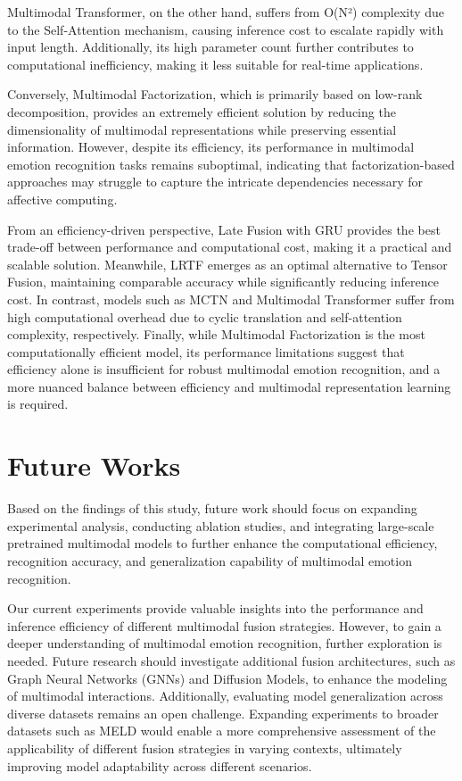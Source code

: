 \documentclass{article}
\begin{document}
Multimodal Transformer, on the other hand, suffers from O(N²) complexity due to the Self-Attention mechanism, causing inference cost to escalate rapidly with input length. Additionally, its high parameter count further contributes to computational inefficiency, making it less suitable for real-time applications.

Conversely, Multimodal Factorization, which is primarily based on low-rank decomposition, provides an extremely efficient solution by reducing the dimensionality of multimodal representations while preserving essential information. However, despite its efficiency, its performance in multimodal emotion recognition tasks remains suboptimal, indicating that factorization-based approaches may struggle to capture the intricate dependencies necessary for affective computing.

From an efficiency-driven perspective, Late Fusion with GRU provides the best trade-off between performance and computational cost, making it a practical and scalable solution. Meanwhile, LRTF emerges as an optimal alternative to Tensor Fusion, maintaining comparable accuracy while significantly reducing inference cost. In contrast, models such as MCTN and Multimodal Transformer suffer from high computational overhead due to cyclic translation and self-attention complexity, respectively. Finally, while Multimodal Factorization is the most computationally efficient model, its performance limitations suggest that efficiency alone is insufficient for robust multimodal emotion recognition, and a more nuanced balance between efficiency and multimodal representation learning is required.

\section{Future Works}

Based on the findings of this study, future work should focus on expanding experimental analysis, conducting ablation studies, and integrating large-scale pretrained multimodal models to further enhance the computational efficiency, recognition accuracy, and generalization capability of multimodal emotion recognition.

Our current experiments provide valuable insights into the performance and inference efficiency of different multimodal fusion strategies. However, to gain a deeper understanding of multimodal emotion recognition, further exploration is needed. Future research should investigate additional fusion architectures, such as Graph Neural Networks (GNNs) and Diffusion Models, to enhance the modeling of multimodal interactions. Additionally, evaluating model generalization across diverse datasets remains an open challenge. Expanding experiments to broader datasets such as MELD  \cite{poria2019meld} would enable a more comprehensive assessment of the applicability of different fusion strategies in varying contexts, ultimately improving model adaptability across different scenarios.
\end{document}
